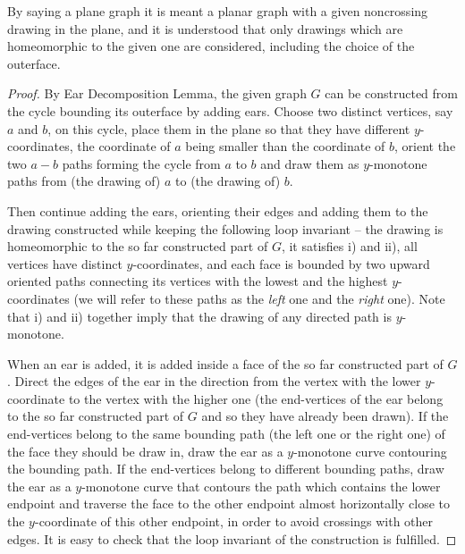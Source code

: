 \begin{comm}
	By saying a plane graph it is meant a planar graph with a given noncrossing drawing in the plane, and it is understood that only drawings which are homeomorphic to the given one are considered, including the choice of the outerface.
\end{comm}

\begin{proof}
	By Ear Decomposition Lemma, the given graph $G$ can be constructed from the cycle bounding its outerface by adding ears. Choose two distinct vertices, say $a$ and $b$, on this cycle, place them in the plane so that they have different $y$-coordinates, the coordinate of $a$ being smaller than the coordinate of $b$, orient the two $a - b$ paths forming the cycle from $a$ to $b$ and draw them as $y$-monotone paths from (the drawing of) $a$ to (the drawing of) $b$.
	
	Then continue adding the ears, orienting their edges and adding them to the drawing constructed while keeping the following loop invariant -- the drawing is homeomorphic to the so far constructed part of $G$, it satisfies i) and ii), all vertices have distinct $y$-coordinates, and each face is bounded by two upward oriented paths connecting its vertices with the lowest and the highest $y$-coordinates (we will refer to these paths as the \textit{left} one and the \textit{right} one). Note that i) and ii) together imply that the drawing of any directed path is $y$-monotone.
	
	When an ear is added, it is added inside a face of the so far constructed part of $G$. Direct the edges of the ear in the direction from the vertex with the lower $y$-coordinate to the vertex with the higher one (the end-vertices of the ear belong to the so far constructed part of $G$ and so they have already been drawn). If the end-vertices belong to the same bounding path (the left one or the right one) of the face they should be draw in, draw the ear as a $y$-monotone curve contouring the bounding path. If the end-vertices belong to different bounding paths, draw the ear as a $y$-monotone curve that contours the path which contains the lower endpoint and traverse the face to the other endpoint almost horizontally close to the $y$-coordinate of this other endpoint, in order to avoid crossings with other edges. It is easy to check that the loop invariant of the construction is fulfilled.
\end{proof}

